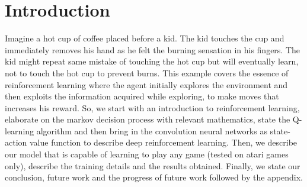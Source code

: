 \documentclass[conference]{IEEEtran}
\begin{document}
\section{Introduction}
Imagine a hot cup of coffee placed before a kid. The kid touches the cup and immediately removes his hand as he felt the burning sensation in his fingers. The kid might repeat same mistake of touching the hot cup but will eventually learn, not to touch the hot cup to prevent burns. This example covers the essence of reinforcement learning where the agent initially explores the environment and then exploits the information acquired while exploring, to make moves that increases his reward. So, we start with an introduction to reinforcement learning, elaborate on the markov decision process with relevant mathematics, state the Q-learning algorithm and then bring in the convolution neural networks as state-action value function to describe deep reinforcement learning. Then, we describe our model that is capable of learning to play any game (tested on atari games only), describe the training details and the results obtained. Finally, we state our conclusion, future work and the progress of future work followed by the appendix.



%
%

\end{document}
